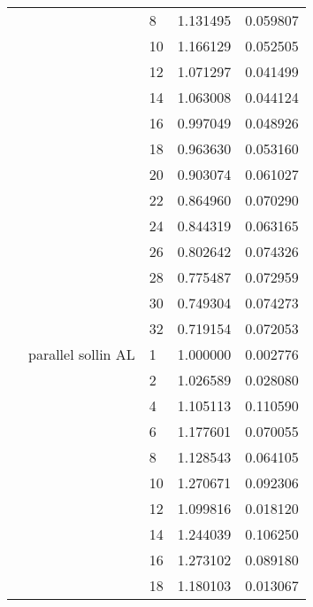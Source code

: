 \begin{tabular}{lllrr}
                      &                     & 8  &  1.131495 &  0.059807 \\
                      &                     & 10 &  1.166129 &  0.052505 \\
                      &                     & 12 &  1.071297 &  0.041499 \\
                      &                     & 14 &  1.063008 &  0.044124 \\
                      &                     & 16 &  0.997049 &  0.048926 \\
                      &                     & 18 &  0.963630 &  0.053160 \\
                      &                     & 20 &  0.903074 &  0.061027 \\
                      &                     & 22 &  0.864960 &  0.070290 \\
                      &                     & 24 &  0.844319 &  0.063165 \\
                      &                     & 26 &  0.802642 &  0.074326 \\
                      &                     & 28 &  0.775487 &  0.072959 \\
                      &                     & 30 &  0.749304 &  0.074273 \\
                      &                     & 32 &  0.719154 &  0.072053 \\
                      & parallel sollin AL & 1  &  1.000000 &  0.002776 \\
                      &                     & 2  &  1.026589 &  0.028080 \\
                      &                     & 4  &  1.105113 &  0.110590 \\
                      &                     & 6  &  1.177601 &  0.070055 \\
                      &                     & 8  &  1.128543 &  0.064105 \\
                      &                     & 10 &  1.270671 &  0.092306 \\
                      &                     & 12 &  1.099816 &  0.018120 \\
                      &                     & 14 &  1.244039 &  0.106250 \\
                      &                     & 16 &  1.273102 &  0.089180 \\
                      &                     & 18 &  1.180103 &  0.013067 \\

\end{tabular}
